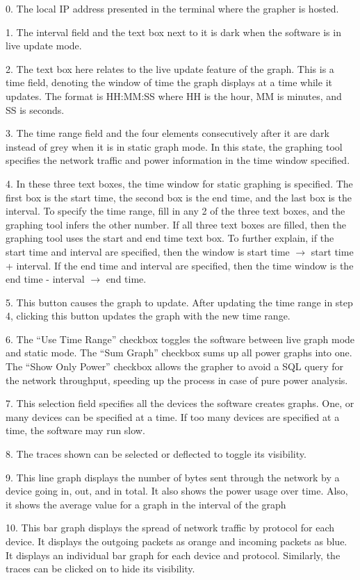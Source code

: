0. The local IP address presented in the terminal where the grapher is hosted.

1. The interval field and the text box next to it is dark when the software is in live update mode.

2. The text box here relates to the live update feature of the graph. This is a time field, denoting the window of time the graph displays at a time while it updates. The format is HH:MM:SS where HH is the hour, MM is minutes, and SS is seconds.

3. The time range field and the four elements consecutively after it are dark instead of grey when it is in static graph mode. In this state, the graphing tool specifies the network traffic and power information in the time window specified.

4. In these three text boxes, the time window for static graphing is specified. The first box is the start time, the second box is the end time, and the last box is the interval. To specify the time range, fill in any 2 of the three text boxes, and the graphing tool infers the other number. If all three text boxes are filled, then the graphing tool uses the start and end time text box. To further explain, if the start time and interval are specified, then the window is start time $\rightarrow$ start time + interval. If the end time and interval are specified, then the time window is the end time - interval $\rightarrow$ end time.

5. This button causes the graph to update. After updating the time range in step 4, clicking this button updates the graph with the new time range.

6. The ``Use Time Range'' checkbox toggles the software between live graph mode and static mode. The ``Sum Graph'' checkbox sums up all power graphs into one. The ``Show Only Power'' checkbox allows the grapher to avoid a SQL query for the network throughput, speeding up the process in case of pure power analysis.

7. This selection field specifies all the devices the software creates graphs. One, or many devices can be specified at a time. If too many devices are specified at a time, the software may run slow.

8. The traces shown can be selected or deflected to toggle its visibility.

9. This line graph displays the number of bytes sent through the network by a device going in, out, and in total. It also shows the power usage over time. Also, it shows the average value for a graph in the interval of the graph

10. This bar graph displays the spread of network traffic by protocol for each device. It displays the outgoing packets as orange and incoming packets as blue. It displays an individual bar graph for each device and protocol. Similarly, the traces can be clicked on to hide its visibility.